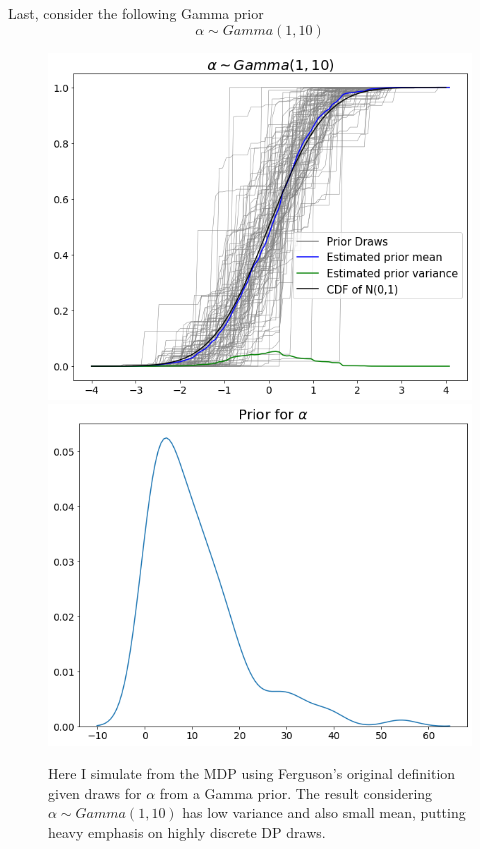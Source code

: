 \documentclass[a4paper, 10pt]{article}
\begin{document}
\begin{enumerate}
\begin{enumerate}
        \noindent Last, consider the following Gamma prior
        $$ \alpha \sim Gamma(1,10)$$
        \begin{figure}[h!]
            \centering
            \includegraphics[scale = 0.4]{c2-1.png}\includegraphics[scale = 0.4]{c2-2.png}
            \caption{Here I simulate from the MDP using Ferguson's original definition given draws for $\alpha$ from a Gamma prior. The result considering $\alpha \sim Gamma(1,10)$ has low variance and also small mean, putting heavy emphasis on highly discrete DP draws.}
            \label{c1}
        \end{figure}
    \end{enumerate}
\end{enumerate}
\end{document}
